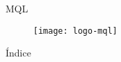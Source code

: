 \documentclass{beamer}
\begin{document}
\begin{withoutheadline}
    \begin{frame}
        \titlepage
    \end{frame}
\end{withoutheadline}

\begin{frame}{MQL}
    \begin{figure}[h]
            \texttt{[image: logo-mql]}
    \end{figure}
\end{frame}

\begin{frame}{Índice}
    \tableofcontents[pausesections]
\end{frame}


%
%
\end{document}
